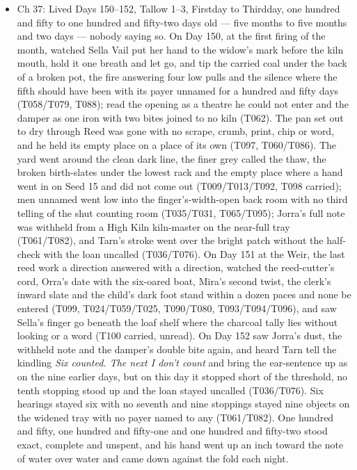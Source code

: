 \documentclass{design/chronicle}
\begin{document}
{\begin{itemize}[leftmargin=1.4em,itemsep=1pt,topsep=3pt,parsep=0pt]
\item Ch 37: Lived Days 150–152, Tallow 1–3, Firstday to Thirdday, one hundred and fifty to one hundred and fifty-two days old --- five months to five months and two days --- nobody saying so. On Day 150, at the first firing of the month, watched Sella Vail put her hand to the widow’s mark before the kiln mouth, hold it one breath and let go, and tip the carried coal under the back of a broken pot, the fire answering four low pulls and the silence where the fifth should have been with its payer unnamed for a hundred and fifty days (T058/T079, T088); read the opening as a theatre he could not enter and the damper as one iron with two bites joined to no kiln (T062). The pan set out to dry through Reed was gone with no scrape, crumb, print, chip or word, and he held its empty place on a place of its own (T097, T060/T086). The yard went around the clean dark line, the finer grey called the thaw, the broken birth-slates under the lowest rack and the empty place where a hand went in on Seed 15 and did not come out (T009/T013/T092, T098 carried); men unnamed went low into the finger’s-width-open back room with no third telling of the shut counting room (T035/T031, T065/T095); Jorra’s full note was withheld from a High Kiln kiln-master on the near-full tray (T061/T082), and Tarn’s stroke went over the bright patch without the half-check with the loan uncalled (T036/T076). On Day 151 at the Weir, the last reed work a direction answered with a direction, watched the reed-cutter’s cord, Orra’s date with the six-oared boat, Mira’s second twist, the clerk’s inward slate and the child’s dark foot stand within a dozen paces and none be entered (T099, T024/T059/T025, T090/T080, T093/T094/T096), and saw Sella’s finger go beneath the loaf shelf where the charcoal tally lies without looking or a word (T100 carried, unread). On Day 152 saw Jorra’s dust, the withheld note and the damper’s double bite again, and heard Tarn tell the kindling \emph{Six counted. The next I don’t count} and bring the ear-sentence up as on the nine earlier days, but on this day it stopped short of the threshold, no tenth stopping stood up and the loan stayed uncalled (T036/T076). Six hearings stayed six with no seventh and nine stoppings stayed nine objects on the widened tray with no payer named to any (T061/T082). One hundred and fifty, one hundred and fifty-one and one hundred and fifty-two stood exact, complete and unspent, and his hand went up an inch toward the note of water over water and came down against the fold each night.


\end{itemize}}
\end{document}
